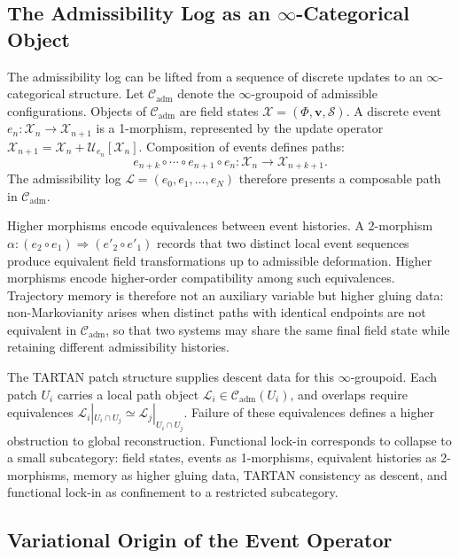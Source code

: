 \documentclass[11pt, a4paper, twocolumn]{article}
\newcommand{\X}{\mathcal{X}}
\newcommand{\Sfield}{\mathcal{S}}
\begin{document}
\subsection{The Admissibility Log as an $\infty$-Categorical Object}

The admissibility log can be lifted from a sequence of discrete updates to an
$\infty$-categorical structure. Let $\mathcal{C}_{\mathrm{adm}}$ denote the
$\infty$-groupoid of admissible configurations. Objects of
$\mathcal{C}_{\mathrm{adm}}$ are field states
$\X = (\Phi,\mathbf{v},\Sfield)$. A discrete event
$e_n : \X_n \to \X_{n+1}$ is a 1-morphism, represented by the update operator
$\X_{n+1} = \X_n + \mathcal{U}_{e_n}[\X_n]$. Composition of events defines
paths:
\[
    e_{n+k}\circ \cdots \circ e_{n+1}\circ e_n :
    \X_n \to \X_{n+k+1}.
\]
The admissibility log $\mathcal{L} = (e_0,e_1,\ldots,e_N)$ therefore presents
a composable path in $\mathcal{C}_{\mathrm{adm}}$.

Higher morphisms encode equivalences between event histories. A 2-morphism
$\alpha : (e_2\circ e_1) \Rightarrow (e'_2\circ e'_1)$ records that two
distinct local event sequences produce equivalent field transformations up to
admissible deformation. Higher morphisms encode higher-order compatibility
among such equivalences. Trajectory memory is therefore not an auxiliary
variable but higher gluing data: non-Markovianity arises when distinct paths
with identical endpoints are not equivalent in $\mathcal{C}_{\mathrm{adm}}$,
so that two systems may share the same final field state while retaining
different admissibility histories.

The TARTAN patch structure supplies descent data for this $\infty$-groupoid.
Each patch $U_i$ carries a local path object
$\mathcal{L}_i \in \mathcal{C}_{\mathrm{adm}}(U_i)$, and overlaps require
equivalences $\mathcal{L}_i|_{U_i\cap U_j} \simeq \mathcal{L}_j|_{U_i\cap
U_j}$. Failure of these equivalences defines a higher obstruction to global
reconstruction. Functional lock-in corresponds to collapse to a small
subcategory: field states, events as 1-morphisms, equivalent histories as
2-morphisms, memory as higher gluing data, TARTAN consistency as descent, and
functional lock-in as confinement to a restricted subcategory.

\subsection{Variational Origin of the Event Operator}
\end{document}
